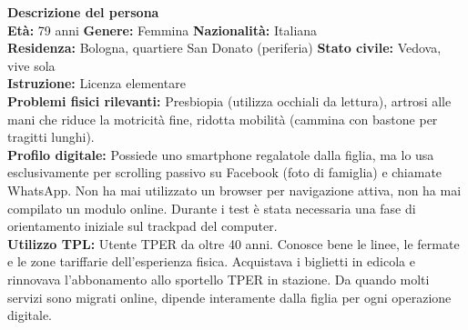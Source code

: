 \documentclass[11pt,a4paper]{article}
\begin{document}
\begin{tcolorbox}[colback=backgroundColor,colframe=borderColor,arc=2mm]
    \textbf{Descrizione del persona} \\[4pt]
    {\small
    \textbf{Età:} 79 anni \hfill
    \textbf{Genere:} Femmina \hfill
    \textbf{Nazionalità:} Italiana \\[2pt]
    \textbf{Residenza:} Bologna, quartiere San Donato (periferia) \hfill
    \textbf{Stato civile:} Vedova, vive sola \\[2pt]
    \textbf{Istruzione:} Licenza elementare \\[2pt]
    \textbf{Problemi fisici rilevanti:} Presbiopia (utilizza occhiali da lettura), artrosi alle mani che riduce la motricità fine, ridotta mobilità (cammina con bastone per tragitti lunghi). \\[2pt]
    \textbf{Profilo digitale:} Possiede uno smartphone regalatole dalla figlia, ma lo usa esclusivamente per scrolling passivo su Facebook (foto di famiglia) e chiamate WhatsApp. Non ha mai utilizzato un browser per navigazione attiva, non ha mai compilato un modulo online. Durante i test è stata necessaria una fase di orientamento iniziale sul trackpad del computer. \\[2pt]
    \textbf{Utilizzo TPL:} Utente TPER da oltre 40 anni. Conosce bene le linee, le fermate e le zone tariffarie dell'esperienza fisica. Acquistava i biglietti in edicola e rinnovava l'abbonamento allo sportello TPER in stazione. Da quando molti servizi sono migrati online, dipende interamente dalla figlia per ogni operazione digitale.
    }
\end{tcolorbox}

\end{document}
